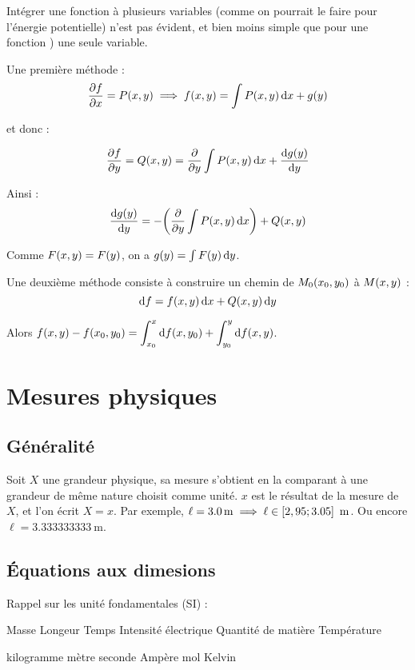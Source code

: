 \documentclass[a4paper,french,bookmarks]{book}
\begin{document}
    \begin{warning}{}{}
        Intégrer une fonction à plusieurs variables (comme on pourrait le faire pour l'énergie potentielle) n'est pas évident, et bien moins simple que pour une fonction ) une seule variable.
    \end{warning}
    
    Une première méthode : 
    \[ \dfrac{\partial f}{\partial x} = P\!\left(x, y\right) \implies f\!\left(x, y\right) = \int P\!\left(x, y\right) \mathrm d x + g\!\left(y\right) \]
    
    et donc :
    
    \[ \dfrac{\partial f}{\partial y} = Q\!\left(x, y\right) = \dfrac{\partial}{\partial y } \int P\!\left(x, y\right) \mathrm d x + \dfrac{\mathrm d g\!\left(y\right)}{\mathrm d y}\]
    
    Ainsi :
    \[ \dfrac{\mathrm d g\!\left(y\right)}{\mathrm d y} = -\!\left(\dfrac{\partial}{\partial y}\int P\!\left(x, y\right)\mathrm d x\right) + Q\!\left(x, y\right)\]
    
    Comme $F\!\left(x, y\right) = F\!\left(y\right)$, on a $g\!\left(y\right) = \int F\!\left(y\right)\mathrm d y$.
    
    Une deuxième méthode consiste à construire un chemin de $M_0\!\left(x_0, y_0\right)$ à $M\!\left(x, y\right)$ :
    \[ \mathrm d f = f\!\left(x, y\right)\mathrm d x + Q\!\left(x, y\right)\mathrm d y\]
    
    Alors $\displaystyle f\!\left(x, y\right) - f\!\left(x_0, y_0\right) = \int_{x_0}^x \mathrm d f\!\left(x, y_0\right) + \int_{y_0}^y \mathrm d f \!\left(x, y\right)$.
    
    \section{Mesures physiques}
    
    \subsection{Généralité}
    
    Soit $X$ une grandeur physique, sa mesure s'obtient en la comparant à une grandeur de même nature choisit comme unité. $x$ est le résultat de la mesure de $X$, et l'on écrit $X = x$. Par exemple, $\ell = \SI{3.0}{\m} \implies \ell \in \intc{2,95 ; 3.05} \ \text{m}$. Ou encore $\ell = \SI{3.333333333}{\m}$.
    
    \subsection{Équations aux dimesions}
    
    Rappel sur les unité fondamentales (SI) :
    \begin{enumerate}
        \begin{minipage}{0.45\linewidth}
            \itt Masse
            \itt Longeur
            \itt Temps
            \itt Intensité électrique
            \itt Quantité de matière
            \itt Température
        \end{minipage}
        \hfill
        \begin{minipage}{0.45\linewidth}
            \itt kilogramme
            \itt mètre
            \itt seconde
            \itt Ampère
            \itt mol
            \itt Kelvin
        \end{minipage}
    \end{enumerate}
    
\end{document}
